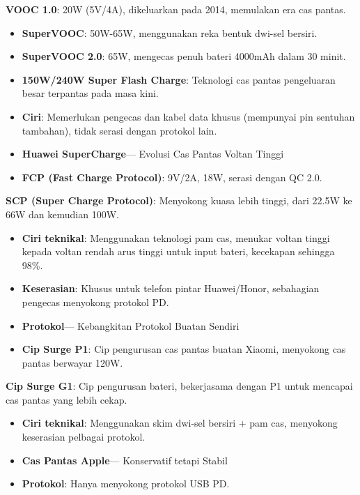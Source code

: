 \textbf{VOOC 1.0}: 20W (5V/4A), dikeluarkan pada 2014, memulakan era cas pantas.

\begin{itemize}
  \item \textbf{SuperVOOC}: 50W-65W, menggunakan reka bentuk dwi-sel bersiri.
  \item \textbf{SuperVOOC 2.0}: 65W, mengecas penuh bateri 4000mAh dalam 30 minit.
  \item \textbf{150W/240W Super Flash Charge}: Teknologi cas pantas pengeluaran besar terpantas pada masa kini.
  \item \textbf{Ciri}: Memerlukan pengecas dan kabel data khusus (mempunyai pin sentuhan tambahan), tidak serasi dengan protokol lain.
  \item \textbf{Huawei SuperCharge}— Evolusi Cas Pantas Voltan Tinggi
  \item \textbf{FCP (Fast Charge Protocol)}: 9V/2A, 18W, serasi dengan QC 2.0.
\end{itemize}

\textbf{SCP (Super Charge Protocol)}: Menyokong kuasa lebih tinggi, dari 22.5W ke 66W dan kemudian 100W.

\begin{itemize}
  \item \textbf{Ciri teknikal}: Menggunakan teknologi pam cas, menukar voltan tinggi kepada voltan rendah arus tinggi untuk input bateri, kecekapan sehingga 98\%.
  \item \textbf{Keserasian}: Khusus untuk telefon pintar Huawei/Honor, sebahagian pengecas menyokong protokol PD.
  \item \textbf{Protokol}— Kebangkitan Protokol Buatan Sendiri
  \item \textbf{Cip Surge P1}: Cip pengurusan cas pantas buatan Xiaomi, menyokong cas pantas berwayar 120W.
\end{itemize}

\textbf{Cip Surge G1}: Cip pengurusan bateri, bekerjasama dengan P1 untuk mencapai cas pantas yang lebih cekap.

\begin{itemize}
  \item \textbf{Ciri teknikal}: Menggunakan skim dwi-sel bersiri + pam cas, menyokong keserasian pelbagai protokol.
  \item \textbf{Cas Pantas Apple}— Konservatif tetapi Stabil
  \item \textbf{Protokol}: Hanya menyokong protokol USB PD.
\end{itemize}

